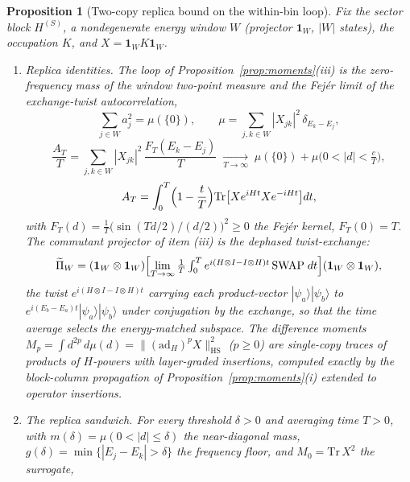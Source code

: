 \documentclass[11pt,a4paper]{article}
\theoremstyle{plain}
\newtheorem{proposition}[theorem]{Proposition}
\theoremstyle{definition}
\theoremstyle{remark}
\begin{document}
\begin{proposition}[Two-copy replica bound on the within-bin loop]\label{prop:replica}
Fix the sector block $H^{(S)}$, a nondegenerate energy window $W$
(projector $\mathbf{1}_W$, $|W|$ states), the occupation $K$, and
$X=\mathbf{1}_WK\mathbf{1}_W$.
\begin{enumerate}[leftmargin=1.6em]
\item \emph{Replica identities.} The loop of
Proposition~\ref{prop:moments}(iii) is the zero-frequency mass of the
window two-point measure and the Fej\'er limit of the exchange-twist
autocorrelation,
\begin{equation*}
\sum_{j\in W}a_j^{2}=\mu(\{0\}),\qquad
\mu=\sum_{j,k\in W}|X_{jk}|^{2}\,\delta_{E_k-E_j},
\end{equation*}
\begin{equation*}
\frac{A_T}{T}=\sum_{j,k\in W}|X_{jk}|^{2}\,
\frac{F_T(E_k-E_j)}{T}\;\xrightarrow[T\to\infty]{}\;\mu(\{0\})
+ \mu\bigl(0<|d|<\tfrac{c}{T}\bigr),
\end{equation*}
\begin{equation*}
A_T=\int_0^T\Bigl(1-\frac{t}{T}\Bigr)
\mathrm{Tr}\bigl[Xe^{iHt}Xe^{-iHt}\bigr]dt,
\end{equation*}
with $F_T(d)=\tfrac{1}{T}\bigl(\sin(Td/2)/(d/2)\bigr)^{2}\ge0$ the
Fej\'er kernel, $F_T(0)=T$.  The commutant projector of item (iii) is the
dephased twist-exchange:
\begin{equation*}
\widetilde{\Pi}_W=(\mathbf{1}_W\otimes\mathbf{1}_W)
\Bigl[\lim_{T\to\infty}\tfrac{1}{T}\textstyle\int_0^T
e^{i(H\otimes I-I\otimes H)t}\,\mathrm{SWAP}\;dt\Bigr]
(\mathbf{1}_W\otimes\mathbf{1}_W),
\end{equation*}
the twist $e^{i(H\otimes I-I\otimes H)t}$ carrying each product-vector
$|\psi_a\rangle|\psi_b\rangle$ to $e^{i(E_b-E_a)t}|\psi_a\rangle|\psi_b
\rangle$ under conjugation by the exchange, so that the time average
selects the energy-matched subspace.  The difference moments
$M_p=\int d^{2p}\,d\mu(d)=\|(\mathrm{ad}_H)^{p}X\|^{2}_{\mathrm{HS}}$
($p\ge0$) are single-copy traces of products of $H$-powers with
layer-graded insertions, computed exactly by the block-column propagation
of Proposition~\ref{prop:moments}(i) extended to operator insertions.
\item \emph{The replica sandwich.} For every threshold $\delta>0$ and
averaging time $T>0$, with $m(\delta)=\mu(0<|d|\le\delta)$ the
near-diagonal mass, $g(\delta)=\min\{|E_j-E_k|>\delta\}$ the frequency
floor, and $M_0=\mathrm{Tr}\,X^{2}$ the surrogate,
\begin{equation*}

\end{equation*}
\end{enumerate}
\end{proposition}
\end{document}
